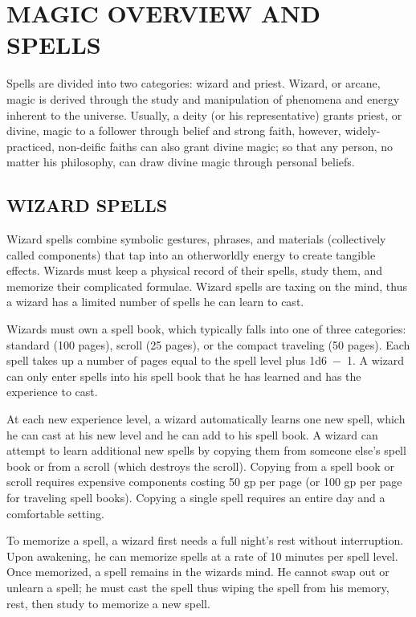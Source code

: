 \chapter{MAGIC OVERVIEW AND SPELLS}

\begin{multicols}{2}

Spells are divided into two categories: wizard and priest.  Wizard, or arcane, magic is derived through the study and manipulation of phenomena and energy inherent to the universe.  Usually, a deity (or his representative) grants priest, or divine, magic to a follower through belief and strong faith, however, widely-practiced, non-deific faiths can also grant divine magic; so that any person, no matter his philosophy, can draw divine magic through personal beliefs.

\section{WIZARD SPELLS}

Wizard spells combine symbolic gestures, phrases, and materials (collectively called components) that tap into an otherworldly energy to create tangible effects.  Wizards must keep a physical record of their spells, study them, and memorize their complicated formulae.  Wizard spells are taxing on the mind, thus a wizard has a limited number of spells he can learn to cast.

Wizards must own a spell book, which typically falls into one of three categories: standard (100 pages), scroll (25 pages), or the compact traveling (50 pages).  Each spell takes up a number of pages equal to the spell level plus 1d6~$-$~1.  A wizard can only enter spells into his spell book that he has learned and has the experience to cast.  

At each new experience level, a wizard automatically learns one new spell, which he can cast at his new level and he can add to his spell book.  A wizard can attempt to learn additional new spells by copying them from someone else's spell book or from a scroll (which destroys the scroll).  Copying from a spell book or scroll requires expensive components costing 50 gp per page (or 100 gp per page for traveling spell books).  Copying a single spell requires an entire day and a comfortable setting.

To memorize a spell, a wizard first needs a full night's rest without interruption.  Upon awakening, he can memorize spells at a rate of 10 minutes per spell level.  Once memorized, a spell remains in the wizards mind.  He cannot swap out or unlearn a spell; he must cast the spell thus wiping the spell from his memory, rest, then study to memorize a new spell.


\end{multicols}
